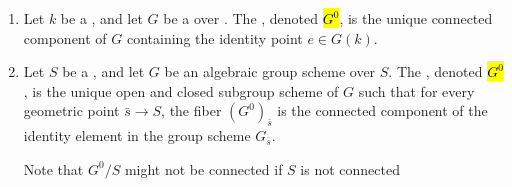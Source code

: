 \begin{definition} \label{definition:identity_component_of_a_group_scheme_over_a_scheme}

    \begin{enumerate}
        \item Let $k$ be a , and let $G$ be a  over . The , denoted \hl{$G^0$}, is the unique connected component of $G$ containing the identity point $e \in G(k)$. 

        \item Let $S$ be a , and let $G$ be an algebraic group scheme over $S$. The , denoted \hl{$G^0$}, is the unique open and closed subgroup scheme of $G$ such that for every geometric point $\bar{s} \to S$, the fiber $(G^0)_{\bar{s}}$ is the connected component of the identity element in the group scheme $G_{\bar{s}}$.

        Note that $G^0/S$ might not be connected if $S$ is not connected
    \end{enumerate}
\end{definition}

